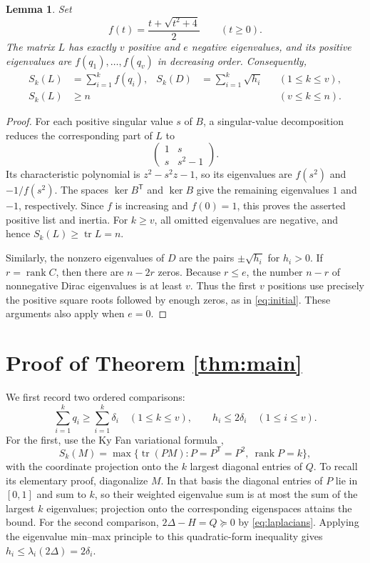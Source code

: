 \documentclass[11pt]{article}
\newtheorem{lemma}{Lemma}
\newcommand{\tr}{\operatorname{tr}}
\newcommand{\rank}{\operatorname{rank}}
\newcommand{\T}{\mathsf{T}}
\begin{document}
\begin{lemma}\label{lem:spectra}
Set
\[
 f(t)=\frac{t+\sqrt{t^2+4}}2\qquad(t\geq0).
\]
The matrix $L$ has exactly $v$ positive and $e$ negative eigenvalues, and
its positive eigenvalues are $f(q_1),\ldots,f(q_v)$ in decreasing order.
Consequently,
\begin{align}
 S_k(L)&=\sum_{i=1}^k f(q_i),&
 S_k(D)&=\sum_{i=1}^k\sqrt{h_i} &&(1\leq k\leq v),\label{eq:initial}\\
 S_k(L)&\geq n &&&&(v\leq k\leq n).\label{eq:trace}
\end{align}
\end{lemma}

\begin{proof}
For each positive singular value $s$ of $B$, a singular-value decomposition
reduces the corresponding part of $L$ to
\[
 \begin{pmatrix}1&s\\s&s^2-1\end{pmatrix}.
\]
Its characteristic polynomial is $z^2-s^2z-1$, so its eigenvalues are
$f(s^2)$ and $-1/f(s^2)$. The spaces $\ker B^{\T}$ and $\ker B$ give the
remaining eigenvalues $1$ and $-1$, respectively. Since $f$ is increasing
and $f(0)=1$, this proves the asserted positive list and inertia. For
$k\geq v$, all omitted eigenvalues are negative, and hence
$S_k(L)\geq\tr L=n$.

Similarly, the nonzero eigenvalues of $D$ are the pairs
$\pm\sqrt{h_i}$ for $h_i>0$. If $r=\rank C$, then there are $n-2r$
zeros. Because $r\leq e$, the number $n-r$ of nonnegative Dirac
eigenvalues is at least $v$. Thus the first $v$ positions use precisely
the positive square roots followed by enough zeros, as in
\eqref{eq:initial}. These arguments also apply when $e=0$.
\end{proof}

\section{Proof of Theorem \ref{thm:main}}

We first record two ordered comparisons:
\begin{equation}\label{eq:degree}
 \sum_{i=1}^kq_i\geq\sum_{i=1}^k\delta_i\quad(1\leq k\leq v),
 \qquad h_i\leq2\delta_i\quad(1\leq i\leq v).
\end{equation}
For the first, use the Ky Fan variational formula \cite{Fan1949},
\[
 S_k(M)=\max\{\tr(PM):P=P^{\T}=P^2,\ \rank P=k\},
\]
with the coordinate projection onto the $k$ largest diagonal entries of
$Q$. To recall its elementary proof, diagonalize $M$. In that basis the
diagonal entries of $P$ lie in $[0,1]$ and sum to $k$, so their weighted
eigenvalue sum is at most the sum of the largest $k$ eigenvalues; projection
onto the corresponding eigenspaces attains the bound. For the second
comparison, $2\Delta-H=Q\succeq0$ by \eqref{eq:laplacians}.
Applying the eigenvalue min--max principle to this quadratic-form inequality
gives $h_i\leq\lambda_i(2\Delta)=2\delta_i$.
\end{document}
